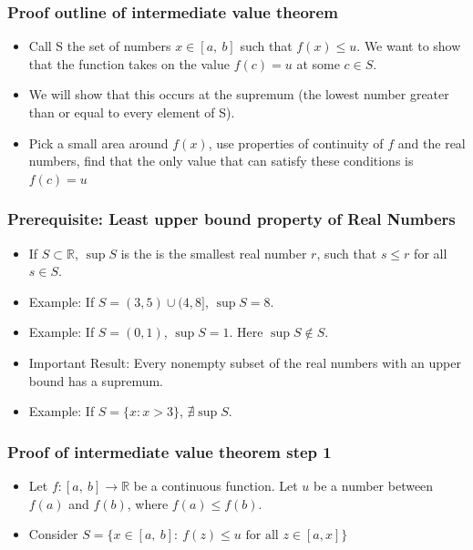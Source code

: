 \documentclass{beamer}
\numberwithin{equation}{section}
\begin{document}
\begin{frame}
\frametitle{Proof outline of intermediate value theorem}
\begin{itemize}
\item Call S the set of numbers $x\in [a,\ b]$ such that $f(x)\leq u$.  We want to show that the function takes on the value $f(c)=u$ at some $c \in S$.   \pause
\item We will show that this occurs at the supremum (the lowest number greater than or equal to every element of S).  \pause
\item Pick a small area around $f(x)$, use properties of continuity of $f$ and the real numbers, find that the only value that can satisfy these conditions is $f(c)=u$
\end{itemize}

\end{frame}



\begin{frame}
\frametitle{Prerequisite: Least upper bound property of Real Numbers}
\begin{itemize}
\item If $S\subset\mathbb{R}$, $\sup S$ is the is the smallest real number $r$, such that $s\leq r$ for all $s\in S$.\pause
\item Example: If $S=(3,5)\cup (4, 8]$, $\sup S=8$.  \pause
\item Example: If $S=(0,1)$, $\sup S=1$.  Here $\sup S\notin S$.\pause
\item Important Result: Every nonempty subset of the real numbers with an upper bound has a supremum.\pause
\item Example: If $S=\{x: x>3\}$, $\nexists \sup S$.


\end{itemize}

\end{frame}


\begin{frame}
\frametitle{Proof of intermediate value theorem step 1}
\begin{itemize}
\item[] Let $f: [a,\ b] \rightarrow \mathbb{R}$ be a continuous function.  Let $u$ be a number between  $f(a)$ and $f(b)$, where $f(a)\leq f(b)$.\pause
\item[] Consider $S=\{x \in [a,\ b]:\ f(z)\leq u\text{ for all } z\in[a, x]\}$\pause
\end{itemize}

\end{frame}
\end{document}
